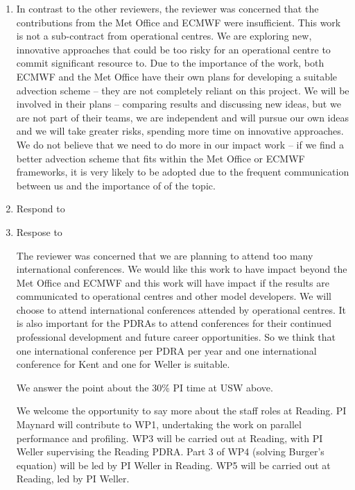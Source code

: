 \begin{enumerate}
\item In contrast to the other reviewers, the reviewer was concerned that the contributions from the Met Office and ECMWF were insufficient. 
This work is not a sub-contract from operational centres. We are exploring new, innovative approaches that could be too risky for an operational centre to commit significant resource to. Due to the importance of the work, both ECMWF and the Met Office have their own plans for developing a suitable advection scheme -- they are not completely reliant on this project. We will be involved in their plans -- comparing results and discussing new ideas, but we are not part of their teams, we are independent and will pursue our own ideas and we will take greater risks, spending more time on innovative approaches. We do not believe that we need to do more in our impact work -- if we find a better advection scheme that fits within the Met Office or ECMWF frameworks, it is very likely to be adopted due to the frequent communication between us and the importance of of the topic.

\item Respond to 

\item Respose to 

The reviewer was concerned that we are planning to attend too many international conferences. We would like this work to have impact beyond the Met Office and ECMWF and this work will have impact if the results are communicated to operational centres and other model developers. We will choose to attend international conferences attended by operational centres. It is also important for the PDRAs to attend conferences for their continued professional development and future career opportunities. So we think that one international conference per PDRA per year and one international conference for Kent and one for Weller is suitable. 

We answer the point about the 30\% PI time at USW above.

We welcome the opportunity to say more about the staff roles at Reading. PI Maynard will contribute to WP1, undertaking the work on parallel performance and profiling. WP3 will be carried out at Reading, with PI Weller supervising the Reading PDRA. Part 3 of WP4 (solving Burger's equation) will be led by PI Weller in Reading. WP5 will be carried out at Reading, led by PI Weller.

\end{enumerate}

